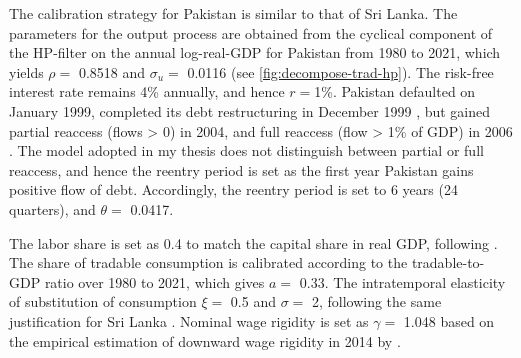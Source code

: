 The calibration strategy for Pakistan is similar to that of Sri Lanka.
The parameters for the output process are obtained from the cyclical component of the HP-filter on the annual log-real-GDP for Pakistan from 1980 to 2021, which yields $\rho = $ 0.8518 and $\sigma_u=$ 0.0116 (see \autoref{fig:decompose-trad-hp}).
The risk-free interest rate remains 4\% annually, and hence $r= $1\%.
Pakistan defaulted on January 1999, completed its debt restructuring in December 1999 \citep{SPGlobal-default-report}, but gained partial reaccess (flows > 0) in 2004, and full reaccess (flow > 1\% of GDP) in 2006 \citep*[][Table 5.6]{trebesch-2011-sovereign}.
The model adopted in my thesis does not distinguish between partial or full reaccess, and hence the reentry period is set as the first year Pakistan gains positive flow of debt. Accordingly, the reentry period is set to 6 years (24 quarters), and $\theta=$ 0.0417.

The labor share is set as 0.4 to match the capital share in real GDP, following \citet{Pakistan-DSGE-calibration}. The share of tradable consumption is calibrated according to the tradable-to-GDP ratio over 1980 to 2021, which gives $a=$ 0.33. The intratemporal elasticity of substitution of consumption $\xi=$ 0.5 and $\sigma=$ 2, following the same justification for Sri Lanka \citep{Pakistan-DSGE-calibration,Uribe-Schmitt-Grohe-textbook}.
Nominal wage rigidity is set as $\gamma=$ 1.048 based on the empirical estimation of downward wage rigidity in 2014 by \citet*{wage-rigidity-data}.

